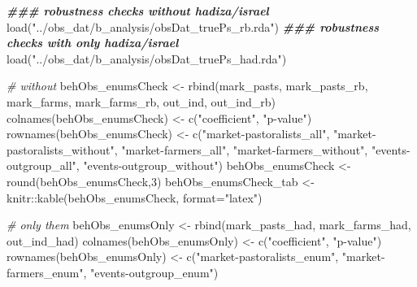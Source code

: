 \documentclass[
]{article}
\newenvironment{Shaded}{\begin{snugshade}}{\end{snugshade}}
\newcommand{\AttributeTok}[1]{\textcolor[rgb]{0.77,0.63,0.00}{#1}}
\newcommand{\CommentTok}[1]{\textcolor[rgb]{0.56,0.35,0.01}{\textit{#1}}}
\newcommand{\DecValTok}[1]{\textcolor[rgb]{0.00,0.00,0.81}{#1}}
\newcommand{\DocumentationTok}[1]{\textcolor[rgb]{0.56,0.35,0.01}{\textbf{\textit{#1}}}}
\newcommand{\FunctionTok}[1]{\textcolor[rgb]{0.00,0.00,0.00}{#1}}
\newcommand{\NormalTok}[1]{#1}
\newcommand{\OtherTok}[1]{\textcolor[rgb]{0.56,0.35,0.01}{#1}}
\newcommand{\SpecialCharTok}[1]{\textcolor[rgb]{0.00,0.00,0.00}{#1}}
\newcommand{\StringTok}[1]{\textcolor[rgb]{0.31,0.60,0.02}{#1}}
\begin{document}
\begin{Shaded}
\begin{Highlighting}[]
\DocumentationTok{\#\#\# robustness checks without hadiza/israel}
\FunctionTok{load}\NormalTok{(}\StringTok{"../obs\_dat/b\_analysis/obsDat\_truePs\_rb.rda"}\NormalTok{)}
\DocumentationTok{\#\#\# robustness checks with only hadiza/israel}
\FunctionTok{load}\NormalTok{(}\StringTok{"../obs\_dat/b\_analysis/obsDat\_truePs\_had.rda"}\NormalTok{)}

\CommentTok{\# without}
\NormalTok{behObs\_enumsCheck }\OtherTok{\textless{}{-}} \FunctionTok{rbind}\NormalTok{(mark\_pasts, mark\_pasts\_rb,}
\NormalTok{                           mark\_farms, mark\_farms\_rb,}
\NormalTok{                           out\_ind, out\_ind\_rb)}
\FunctionTok{colnames}\NormalTok{(behObs\_enumsCheck) }\OtherTok{\textless{}{-}} \FunctionTok{c}\NormalTok{(}\StringTok{"coefficient"}\NormalTok{, }\StringTok{"p{-}value"}\NormalTok{)}
\FunctionTok{rownames}\NormalTok{(behObs\_enumsCheck) }\OtherTok{\textless{}{-}} \FunctionTok{c}\NormalTok{(}\StringTok{"market{-}pastoralists\_all"}\NormalTok{,}
                                 \StringTok{"market{-}pastoralists\_without"}\NormalTok{,}
                                 \StringTok{"market{-}farmers\_all"}\NormalTok{,}
                                 \StringTok{"market{-}farmers\_without"}\NormalTok{,}
                                 \StringTok{"events{-}outgroup\_all"}\NormalTok{,}
                                 \StringTok{"events{-}outgroup\_without"}\NormalTok{)}
\NormalTok{behObs\_enumsCheck }\OtherTok{\textless{}{-}} \FunctionTok{round}\NormalTok{(behObs\_enumsCheck,}\DecValTok{3}\NormalTok{)}
\NormalTok{behObs\_enumsCheck\_tab }\OtherTok{\textless{}{-}}\NormalTok{ knitr}\SpecialCharTok{::}\FunctionTok{kable}\NormalTok{(behObs\_enumsCheck, }\AttributeTok{format=}\StringTok{"latex"}\NormalTok{)}

\CommentTok{\# only them}
\NormalTok{behObs\_enumsOnly }\OtherTok{\textless{}{-}} \FunctionTok{rbind}\NormalTok{(mark\_pasts\_had, mark\_farms\_had, out\_ind\_had)}
\FunctionTok{colnames}\NormalTok{(behObs\_enumsOnly) }\OtherTok{\textless{}{-}} \FunctionTok{c}\NormalTok{(}\StringTok{"coefficient"}\NormalTok{, }\StringTok{"p{-}value"}\NormalTok{)}
\FunctionTok{rownames}\NormalTok{(behObs\_enumsOnly) }\OtherTok{\textless{}{-}} \FunctionTok{c}\NormalTok{(}\StringTok{"market{-}pastoralists\_enum"}\NormalTok{,}
                                 \StringTok{"market{-}farmers\_enum"}\NormalTok{,}
                                 \StringTok{"events{-}outgroup\_enum"}\NormalTok{)}
\end{Highlighting}
\end{Shaded}
\end{document}
